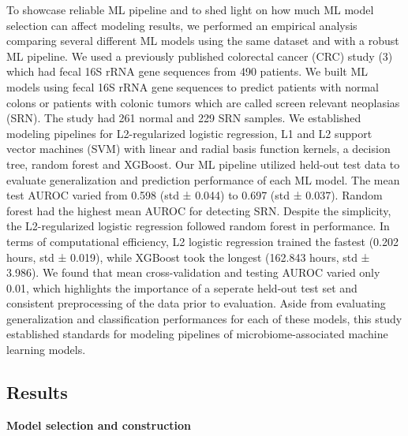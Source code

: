 \documentclass[11pt,]{article}
\begin{document}
To showcase reliable ML pipeline and to shed light on how much ML model
selection can affect modeling results, we performed an empirical
analysis comparing several different ML models using the same dataset
and with a robust ML pipeline. We used a previously published colorectal
cancer (CRC) study (3) which had fecal 16S rRNA gene sequences from 490
patients. We built ML models using fecal 16S rRNA gene sequences to
predict patients with normal colons or patients with colonic tumors
which are called screen relevant neoplasias (SRN). The study had 261
normal and 229 SRN samples. We established modeling pipelines for
L2-regularized logistic regression, L1 and L2 support vector machines
(SVM) with linear and radial basis function kernels, a decision tree,
random forest and XGBoost. Our ML pipeline utilized held-out test data
to evaluate generalization and prediction performance of each ML model.
The mean test AUROC varied from 0.598 (std ± 0.044) to 0.697 (std ±
0.037). Random forest had the highest mean AUROC for detecting SRN.
Despite the simplicity, the L2-regularized logistic regression followed
random forest in performance. In terms of computational efficiency, L2
logistic regression trained the fastest (0.202 hours, std ± 0.019),
while XGBoost took the longest (162.843 hours, std ± 3.986). We found
that mean cross-validation and testing AUROC varied only 0.01, which
highlights the importance of a seperate held-out test set and consistent
preprocessing of the data prior to evaluation. Aside from evaluating
generalization and classification performances for each of these models,
this study established standards for modeling pipelines of
microbiome-associated machine learning models.

\subsection{Results}\label{results}

\textbf{Model selection and construction}
\end{document}

